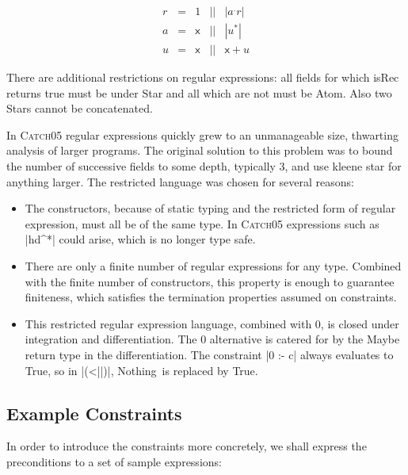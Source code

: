 \documentclass[preprint]{sigplanconf}
\newcommand{\C}[1]{\textsf{#1}}
\newcommand{\catch}{\textsc{Catch}}
\begin{document}
\[\begin{array}{lllll}
r & = & 1     & || & |a^.r| \\
a & = & \C{x} & || & |u^*| \\
u & = & \C{x} & || & \C{x} + u
\end{array}\]

There are additional restrictions on regular expressions: all fields for which \C{isRec} returns true must be under \C{Star} and all which are not must be \C{Atom}. Also two \C{Star}s cannot be concatenated.

In \catch05 regular expressions quickly grew to an unmanageable size, thwarting analysis of larger programs. The original solution to this problem was to bound the number of successive fields to some depth, typically 3, and use kleene star for anything larger. The restricted language was chosen for several reasons:

\begin{itemize}
\item The constructors, because of static typing and the restricted form of regular expression, must all be of the same type. In \catch05 expressions such as |hd^*| could arise, which is no longer type safe.

\item There are only a finite number of regular expressions for any type. Combined with the finite number of constructors, this property is enough to guarantee finiteness, which satisfies the termination properties assumed on constraints.

\item This restricted regular expression language, combined with 0, is closed under integration and differentiation. The 0 alternative is catered for by the \C{Maybe} return type in the differentiation. The constraint |0 :- c| always evaluates to True, so in |(<||)|, \C{Nothing}\ is replaced by True.
\end{itemize}

\subsection{Example Constraints}
\label{sec:small_examples}

In order to introduce the constraints more concretely, we shall express the preconditions to a set of sample expressions:
\end{document}
